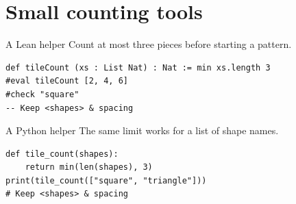 \section{Small counting tools}
\begin{frame}[fragile]{A Lean helper}
Count at most three pieces before starting a pattern.
\begin{verbatim}
def tileCount (xs : List Nat) : Nat := min xs.length 3
#eval tileCount [2, 4, 6]
#check "square"
-- Keep <shapes> & spacing
\end{verbatim}
\end{frame}

\begin{frame}[fragile]{A Python helper}
The same limit works for a list of shape names.
\begin{verbatim}
def tile_count(shapes):
    return min(len(shapes), 3)
print(tile_count(["square", "triangle"]))
# Keep <shapes> & spacing
\end{verbatim}
\end{frame}
